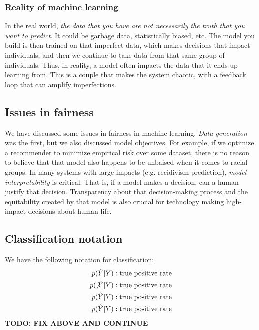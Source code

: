 \documentclass[titlepage, 12pt, leqno]{article}
\begin{document}
\subsubsection{Reality of machine learning}
In the real world, \textit{the data that you have are not necessarily the
truth that you want to predict}. It could be garbage data, statistically
biased, etc. The model you build is then trained on that imperfect data, which
makes decisions that impact individuals, and then we continue to take data from
that same group of individuals. Thus, in reality, a model often impacts the 
data that it ends up learning from. This is a couple that makes the system 
chaotic, with a feedback loop that can amplify imperfections.

\subsection{Issues in fairness}
We have discussed some issues in fairness in machine learning. 
\textit{Data generation} was the first, but we also discussed model objectives.
For example, if we optimize a recommender to minimize empirical risk over some
dataset, there is no reason to believe that that model also happens to be
unbaised when it comes to racial groups. In many systems with large impacts 
(e.g. recidivism prediction), \textit{model interpretability} is critical. That
is, if a model makes a decision, can a human justify that decision. 
Transparency about that decision-making process and the equitability created by
that model is also crucial for technology making high-impact decisions about 
human life.

\subsection{Classification notation}
We have the following notation for classification:
\begin{align*}
    p(\hat Y|Y) &: \text{true positive rate}\\
    p(\not\hat Y|Y) &: \text{true positive rate}\\
    p(\hat Y|Y) &: \text{true positive rate}\\
    p(\hat Y|Y) &: \text{true positive rate}\\
\end{align*}
\textbf{TODO: FIX ABOVE AND CONTINUE}
\end{document}
